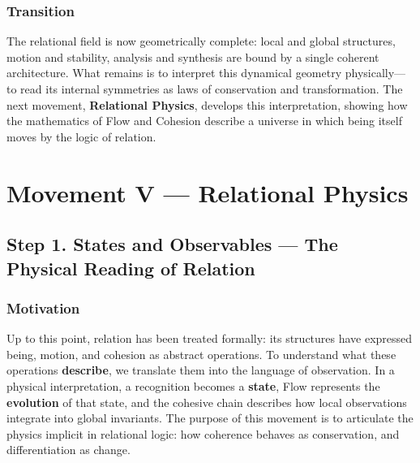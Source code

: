 \documentclass[11pt]{article}
\begin{document}
\subsubsection*{Transition}
\label{sec:org1a66f7d}
The relational field is now geometrically complete:  
local and global structures, motion and stability, analysis and synthesis  
are bound by a single coherent architecture.  
What remains is to interpret this dynamical geometry physically—  
to read its internal symmetries as laws of conservation and transformation.  
The next movement, \textbf{Relational Physics}, develops this interpretation,  
showing how the mathematics of Flow and Cohesion describe  
a universe in which being itself moves by the logic of relation.
\section*{Movement V — Relational Physics}
\label{sec:orgf5c620d}
\subsection*{Step 1. States and Observables — The Physical Reading of Relation}
\label{sec:org595eb92}

\subsubsection*{Motivation}
\label{sec:org76ab66a}
Up to this point, relation has been treated formally:  
its structures have expressed being, motion, and cohesion as abstract operations.  
To understand what these operations \textbf{describe},  
we translate them into the language of observation.  
In a physical interpretation, a recognition becomes a \textbf{state},  
Flow represents the \textbf{evolution} of that state,  
and the cohesive chain describes how local observations integrate into global invariants.  
The purpose of this movement is to articulate the physics implicit in relational logic:  
how coherence behaves as conservation, and differentiation as change.
\end{document}
